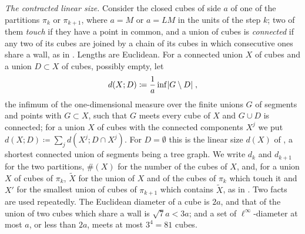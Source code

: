 \documentclass[11pt]{preprint}
\DeclarePairedDelimiter{\abs}{\lvert}{\rvert}
\numberwithin{equation}{section}
\theoremstyle{definition}
\theoremstyle{remark}
\theoremstyle{plain}
\begin{document}
\emph{The contracted linear size.} Consider the closed cubes of side $a$ of one of the partitions $\pi_k$ or $\pi_{k+1}$, where $a = M$ or $a = LM$ in the units of the step $k$; two of them \emph{touch} if they have a point in common, and a union of cubes is \emph{connected} if any two of its cubes are joined by a chain of its cubes in which consecutive ones share a wall, as in \cite[p.~257]{BalabanRG1}. Lengths are Euclidean. For a connected union $X$ of cubes and a union $D \subset X$ of cubes, possibly empty, let
\begin{equation}\label{eq:contracted-size}
    d(X; D) \coloneqq \frac{1}{a}\inf\abs{G \setminus D}\;,
\end{equation}
the infimum of the one-dimensional measure over the finite unions $G$ of segments and points with $G \subset X$, such that $G$ meets every cube of $X$ and $G \cup D$ is connected; for a union $X$ of cubes with the connected components $X^j$ we put $d(X; D) \coloneqq \sum_jd(X^j; D \cap X^j)$. For $D = \emptyset$ this is the linear size $d(X)$ of \cite[p.~257]{BalabanRG1}, a shortest connected union of segments being a tree graph. We write $d_k$ and $d_{k+1}$ for the two partitions, $\#(X)$ for the number of the cubes of $X$, and, for a union $X$ of cubes of $\pi_k$, $\tilde X$ for the union of $X$ and of the cubes of $\pi_k$ which touch it and $X'$ for the smallest union of cubes of $\pi_{k+1}$ which contains $\tilde X$, as in \cite[p.~13]{BalabanRG2}. Two facts are used repeatedly. The Euclidean diameter of a cube is $2a$, and that of the union of two cubes which share a wall is $\sqrt7a < 3a$; and a set of $\ell^\infty$-diameter at most $a$, or less than $2a$, meets at most $3^4 = 81$ cubes.
\end{document}

